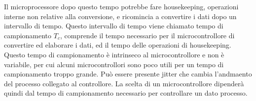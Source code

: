 \documentclass{article}
\numberwithin{equation}{subsection}
\begin{document}
\begin{center}
\end{center}

Il microprocessore dopo questo tempo potrebbe fare housekeeping, operazioni interne non relative alla conversione, e ricomincia a convertire i dati dopo un intervallo di tempo. 
Questo intervallo di tempo viene chiamato tempo di campionamento $T_c$, comprende il tempo necessario per il microcontrollore di convertire ed elaborare i dati, ed il tempo 
delle operazioni di housekeeping. Questo tempo di campionamento è intrinseco al microcontrollore e non è variabile, per cui alcuni microcontrollori sono poco utili per 
un tempo di campionamento troppo grande. Può essere presente jitter che cambia l'andmaento del processo collegato al controllore. La scelta di un microcontrollore dipenderà 
quindi dal tempo di campionamento necessario per controllare un dato processo. 
\end{document}
